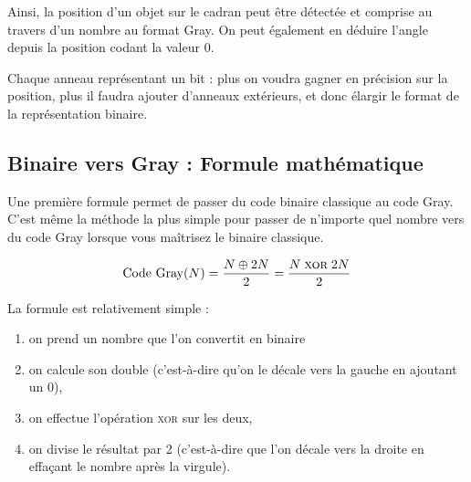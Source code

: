 \documentclass[11pt,a4paper]{article}
\begin{document}
Ainsi, la position d'un objet sur le cadran peut être détectée et comprise au travers d'un nombre au format Gray.
On peut également en déduire l'angle depuis la position codant la valeur 0.

Chaque anneau représentant un bit : plus on voudra gagner en précision sur la position, plus il faudra ajouter d'anneaux extérieurs, et donc élargir le format de la représentation binaire.


\bigskip


\subsection{Binaire vers Gray : Formule mathématique}

Une première formule permet de passer du code binaire classique au code Gray.
C'est même la méthode la plus simple pour passer de n'importe quel nombre vers du code Gray lorsque vous maîtrisez le binaire classique.

\begin{equation*}
\text{Code Gray}(N) = \frac{N \oplus 2N}{2} = \frac{N \; \textsc{xor} \; 2N}{2}
\end{equation*}

\medskip

La formule est relativement simple :
\begin{enumerate}[label=(\alph*)]
\item on prend un nombre que l'on convertit en binaire
\item on calcule son double (c'est-à-dire qu'on le décale vers la gauche en ajoutant un 0),
\item on effectue l'opération \textsc{xor} sur les deux,
\item on divise le résultat par 2 (c'est-à-dire que l'on décale vers la droite en effaçant le nombre après la virgule).
\end{enumerate}
\end{document}
